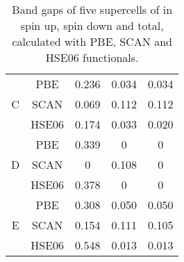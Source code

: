 \begin{table}[H]
\begin{tabular}{@{}ccccc@{}}
\multicolumn{1}{c|}{\multirow{3}{*}{C}} & PBE           & 0.236                                                           & 0.034                                                           & 0.034                                                            \\
\multicolumn{1}{c|}{}                   & SCAN          & 0.069                                                           & 0.112                                                           & 0.112                                                            \\
\multicolumn{1}{c|}{}                   & HSE06         & 0.174                                                           & 0.033                                                           & 0.020                                                            \\ \midrule
\multicolumn{1}{c|}{\multirow{3}{*}{D}} & PBE           & 0.339                                                           & 0                                                           & 0                                                                 \\
\multicolumn{1}{c|}{}                   & SCAN          & 0                                                                & 0.108                                                           & 0                                                                 \\
\multicolumn{1}{c|}{}                   & HSE06         & 0.378                                                           & 0                                                                & 0                                                                 \\ \midrule
\multicolumn{1}{c|}{\multirow{3}{*}{E}} & PBE           & 0.308                                                           & 0.050                                                           & 0.050                                                            \\
\multicolumn{1}{c|}{}                   & SCAN          & 0.154                                                           & 0.111                                                           & 0.105                                                            \\
\multicolumn{1}{c|}{}                   & HSE06         & 0.548                                                           & 0.013                                                           & 0.013                                                            \\ \bottomrule
\end{tabular}
\caption{Band gaps of five supercells of  in spin up, spin down and total, calculated with PBE, SCAN and HSE06 functionals.}
\end{table}

